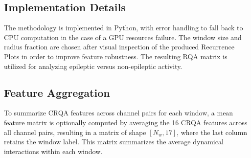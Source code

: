 \documentclass{article}
\begin{document}
				\subsection{Implementation Details}
				\label{subsec:implementation_details}

				The methodology is implemented in Python, with error handling to fall back to CPU computation in the case of a GPU resources failure. 
				The window size and radius fraction are chosen after visual inspection of the produced Recurrence Plots in order to improve feature robustness. 
				The resulting RQA matrix is utilized for analyzing epileptic versus non-epileptic activity.


				 \subsection{Feature Aggregation}
				 \label{subsec:feature_aggregation}
				 To summarize CRQA features across channel pairs for each window, a mean feature matrix is optionally computed by averaging the 16 CRQA features across all channel pairs, resulting in a matrix of shape \([N_w, 17]\), where the last column retains the window label. This matrix summarizes the average dynamical interactions within each window.
\end{document}
